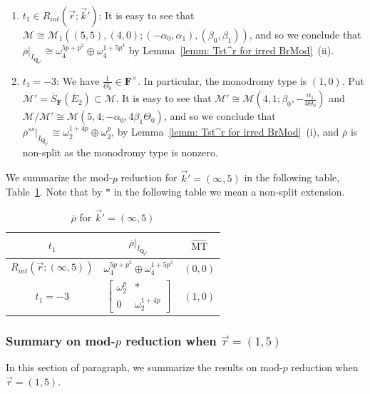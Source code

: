 \documentclass[11pt]{amsart}
\theoremstyle{definition}
\numberwithin{equation}{subsection}
\theoremstyle{plain}
\theoremstyle{plain}
\theoremstyle{plain}
\theoremstyle{plain}
\theoremstyle{plain}
\theoremstyle{plain}
\theoremstyle{plain}
\theoremstyle{plain}
\theoremstyle{plain}
\theoremstyle{plain}
\theoremstyle{plain}
\theoremstyle{plain}
\theoremstyle{definition}
\theoremstyle{definition}
\theoremstyle{definition}
\theoremstyle{remark}
\renewcommand{\(}{\textup{(}}
\renewcommand{\)}{\textup{)}}
\newcommand{\Q}{\mathbf{Q}}
\newcommand{\F}{\mathbf{F}}
\newcommand{\barS}{\overline{S}}
\newcommand{\rhobar}{\overline{\rho}}
\newcommand{\cM}{\mathcal{M}}
\newcommand{\barE}{\overline{E}}
\newcommand{\vr}{\vec{r}}
\newcommand{\vk}{\vec{k}}
\newcommand{\IQptwo}{{I_{\Q_{p^2}}}}
\begin{document}
\begin{enumerate}[leftmargin=*]
  \item $t_1\in R_{int}(\vr;\vk')$: It is easy to see that $\cM\cong\cM_1((5,5),(4,0);(-\alpha_0,\alpha_1),(\beta_0,\beta_1))$, and so we conclude that $\rhobar|_\IQptwo\cong\omega_4^{5p+p^2}\oplus\omega_4^{1+5p^3}$ by Lemma~\ref{lemm: Tst^r for irred BrMod}~(ii).
  \item $t_1=-3$: We have $\frac{1}{\Theta_0}\in\F^\times$. In particular, the monodromy type is $(1,0)$. Put $\cM'=\barS_{\F}(\barE_2)\subset\cM$. It is easy to see that $\cM'\cong \cM(4,1;\beta_0,-\frac{\alpha_1}{4\Theta_0})$ and $\cM/\cM'\cong \cM(5,4;-\alpha_0,4\beta_1\Theta_0)$, and so we conclude that $\rhobar^{ss}|_\IQptwo\cong \omega_2^{1+4p}\oplus\omega_2^p$, by Lemma~\ref{lemm: Tst^r for irred BrMod}~(i), and $\rhobar$ is non-split as the monodromy type is nonzero.
\end{enumerate}
We summarize the mod-$p$ reduction for $\vk'=(\infty,5)$ in the following table, Table~\ref{tab: (infty,5)}. Note that by $\ast$ in the following table we mean a non-split extension.
\begin{table}[htbp]%
  \centering
  \begin{tabular}{|c||c|c|}
    \hline
    $t_1$ & $\rhobar|_{I_{\Q_{p^2}}}$ & $\vec{\mathrm{MT}}$ \\\hline\hline
    $R_{int}(\vr;(\infty,5))$
      & $\omega_4^{5p+p^2}\oplus\omega_4^{1+5p^3}$ & $(0,0)$ \\\hline
    $t_1=-3$
      & $
      \begin{bmatrix}
        \omega_2^p & * \\
        0 & \omega_2^{1+4p}
      \end{bmatrix}$ & $(1,0)$ \\\hline
  \end{tabular}
  \caption{$\rhobar$ for $\vk'=(\infty,5)$}\label{tab: (infty,5)}
\end{table}


\subsubsection{\textbf{Summary on mod-$p$ reduction when $\vr=(1,5)$}}\label{subsubsec: summary for 1,5}
In this section of paragraph, we summarize the results on mod-$p$ reduction when $\vr=(1,5)$. 
\end{document}
